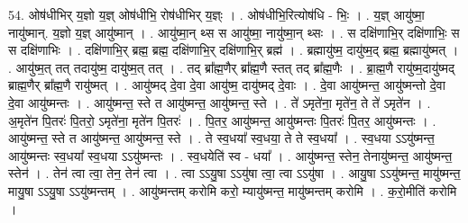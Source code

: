 \documentclass[17pt]{extarticle}
\begin{document}
54. ओष॑धीभिर् य॒ज्ञो य॒ज्ञ् ओष॑धीभि॒ रोष॑धीभिर् य॒ज्ञ्ः । . ओष॑धीभि॒रित्योष॑धि - भिः॒ । . य॒ज्ञ् आयु॑ष्मा॒ नायु॑ष्मान्. य॒ज्ञो य॒ज्ञ् आयु॑ष्मान् । . आयु॑ष्मा॒न् थ्स स आयु॑ष्मा॒ नायु॑ष्मा॒न् थ्सः । . स दक्षि॑णाभि॒र् दक्षि॑णाभिः॒ स स दक्षि॑णाभिः । . दक्षि॑णाभि॒र् ब्रह्म॒ ब्रह्म॒ दक्षि॑णाभि॒र् दक्षि॑णाभि॒र् ब्रह्म॑ । . ब्रह्मायु॑ष्म॒ दायु॑ष्म॒द् ब्रह्म॒ ब्रह्मायु॑ष्मत् । . आयु॑ष्म॒त् तत् तदायु॑ष्म॒ दायु॑ष्म॒त् तत् । . तद् ब्रा᳚ह्म॒णैर् ब्रा᳚ह्म॒णै स्तत् तद् ब्रा᳚ह्म॒णैः । . ब्रा॒ह्म॒णै रायु॑ष्म॒दायु॑ष्मद् ब्राह्म॒णैर् ब्रा᳚ह्म॒णै रायु॑ष्मत् । . आयु॑ष्मद् दे॒वा दे॒वा आयु॑ष्म॒ दायु॑ष्मद् दे॒वाः । . दे॒वा आयु॑ष्मन्त॒ आयु॑ष्मन्तो दे॒वा दे॒वा आयु॑ष्मन्तः । . आयु॑ष्मन्त॒ स्ते त आयु॑ष्मन्त॒ आयु॑ष्मन्त॒ स्ते । . ते॑ ऽमृते॑ना॒ मृते॑न॒ ते ते॑ ऽमृते॑न । . अ॒मृते॑न पि॒तरः॑ पि॒तरो॒ ऽमृते॑ना॒ मृते॑न पि॒तरः॑ । . पि॒तर॒ आयु॑ष्मन्त॒ आयु॑ष्मन्तः पि॒तरः॑ पि॒तर॒ आयु॑ष्मन्तः । . आयु॑ष्मन्त॒ स्ते त आयु॑ष्मन्त॒ आयु॑ष्मन्त॒ स्ते । . ते स्व॒धया᳚ स्व॒धया॒ ते ते स्व॒धया᳚ । . स्व॒धया ऽऽयु॑ष्मन्त॒ आयु॑ष्मन्तः स्व॒धया᳚ स्व॒धया ऽऽयु॑ष्मन्तः । . स्व॒धयेति॑ स्व - धया᳚ । . आयु॑ष्मन्त॒ स्तेन॒ तेनायु॑ष्मन्त॒ आयु॑ष्मन्त॒ स्तेन॑ । . तेन॑ त्वा त्वा॒ तेन॒ तेन॑ त्वा । . त्वा ऽऽयु॒षा ऽऽयु॑षा त्वा॒ त्वा ऽऽयु॑षा । . आयु॒षा ऽऽयु॑ष्मन्त॒ मायु॑ष्मन्त॒ मायु॒षा ऽऽयु॒षा ऽऽयु॑ष्मन्तम् । . आयु॑ष्मन्तम् करोमि करो॒ म्यायु॑ष्मन्त॒ मायु॑ष्मन्तम् करोमि । . क॒रो॒मीति॑ करोमि । \newline
\end{document}

